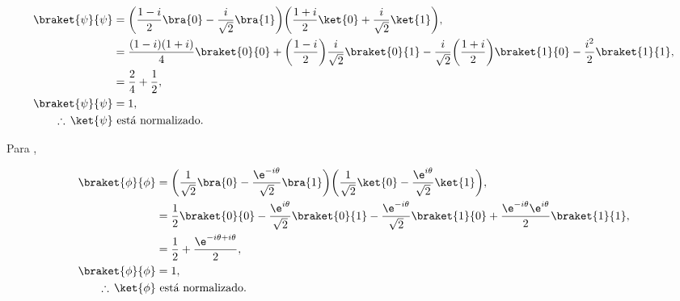\documentclass[./../main.tex]{subfiles}
\begin{document}
\begin{problema}
\begin{enumerate}
		      \begin{align*}
			      \braket{\psi}{\psi}     & = \biggl(\dfrac{1 - i}{2}\bra{0} - \dfrac{i}{\sqrt{2}}\bra{1}\biggr)\biggl(\dfrac{1 + i}{2}\ket{0} + \dfrac{i}{\sqrt{2}}\ket{1}\biggr),                                                                     \\
			                              & = \dfrac{(1 - i)(1 + i)}{4}\braket{0}{0} + \biggl(\dfrac{1 - i}{2}\biggr)\dfrac{i}{\sqrt{2}}\braket{0}{1} - \dfrac{i}{\sqrt{2}}\biggl(\dfrac{1 + i}{2}\biggr)\braket{1}{0} - \dfrac{i^{2}}{2}\braket{1}{1}, \\
			                              & = \dfrac{2}{4} + \dfrac{1}{2},                                                                                                                                                                              \\
			      \braket{\psi}{\psi}     & = 1,                                                                                                                                                                                                        \\
			      \therefore\, \ket{\psi} & \text{ está normalizado}.
		      \end{align*}

		      Para ,

		      \begin{align*}
			      \braket{\phi}{\phi}     & = \biggl(\dfrac{1}{\sqrt{2}}\bra{0} - \dfrac{\e^{-i\theta}}{\sqrt{2}}\bra{1}\biggr)\biggl(\dfrac{1}{\sqrt{2}}\ket{0} - \dfrac{\e^{i\theta}}{\sqrt{2}}\ket{1}\biggr),          \\
			                              & = \dfrac{1}{2}\braket{0}{0} - \dfrac{\e^{i\theta}}{\sqrt{2}}\braket{0}{1} - \dfrac{\e^{-i\theta}}{\sqrt{2}}\braket{1}{0} + \dfrac{\e^{-i\theta}\e^{i\theta}}{2}\braket{1}{1}, \\
			                              & = \dfrac{1}{2} + \dfrac{\e^{-i\theta + i\theta}}{2},                                                                                                                          \\
			      \braket{\phi}{\phi}     & = 1,                                                                                                                                                                          \\
			      \therefore\, \ket{\phi} & \text{ está normalizado}.
		      \end{align*}


\end{enumerate}
\end{problema}
\end{document}

